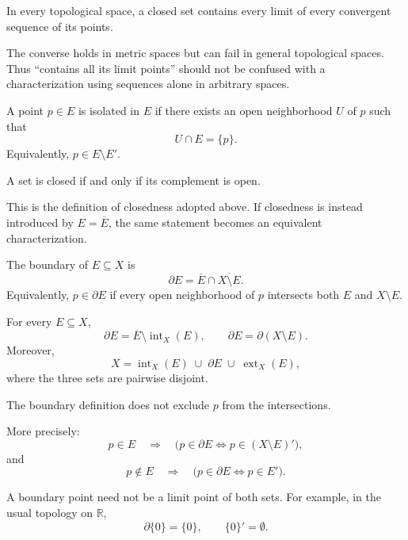 \documentclass[answers,12pt,addpoints]{exam}
\begin{document}
\begin{remark}
In every topological space, a closed set contains every
limit of every convergent sequence of its points.

The converse holds in metric spaces but can fail in
general topological spaces. Thus ``contains all its limit
points'' should not be confused with a characterization
using sequences alone in arbitrary spaces.
\end{remark}

\begin{definition}
A point $p\in E$ is isolated in $E$ if there exists an open
neighborhood $U$ of $p$ such that
\[
U\cap E=\{p\}.
\]
Equivalently, $p\in E\setminus E'$.
\end{definition}

\begin{theorem}
A set is closed if and only if its complement is open.
\end{theorem}

\begin{remark}
This is the definition of closedness adopted above.
If closedness is instead introduced by
$E=\overline{E}$, the same statement becomes an equivalent
characterization.
\end{remark}

\begin{definition}[Boundary]
The boundary of $E\subseteq X$ is
\[
\partial E
=
\overline{E}\cap\overline{X\setminus E}.
\]
Equivalently, $p\in\partial E$ if every open neighborhood
of $p$ intersects both $E$ and $X\setminus E$.
\end{definition}

\begin{remark}
For every $E\subseteq X$,
\[
\partial E
=
\overline{E}\setminus\operatorname{int}_X(E),
\qquad
\partial E=\partial(X\setminus E).
\]
Moreover,
\[
X=
\operatorname{int}_X(E)
\;\cup\;
\partial E
\;\cup\;
\operatorname{ext}_X(E),
\]
where the three sets are pairwise disjoint.
\end{remark}

\begin{remark}
The boundary definition does not exclude $p$ from the
intersections.

More precisely:
\[
p\in E
\quad\Longrightarrow\quad
\bigl(p\in\partial E
\Longleftrightarrow p\in(X\setminus E)'\bigr),
\]
and
\[
p\notin E
\quad\Longrightarrow\quad
\bigl(p\in\partial E
\Longleftrightarrow p\in E'\bigr).
\]

A boundary point need not be a limit point of both sets.
For example, in the usual topology on $\mathbb{R}$,
\[
\partial\{0\}=\{0\},
\qquad
\{0\}'=\emptyset.
\]
\end{remark}
\end{document}
